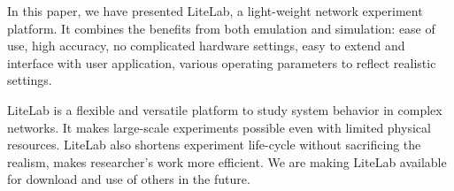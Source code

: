 \documentclass[conference]{IEEEtran}
\begin{document}
In this paper, we have presented LiteLab, a light-weight network
experiment platform.  It combines the benefits from both emulation and
simulation: ease of use, high accuracy, no complicated hardware
settings, easy to extend and interface with user application, various
operating parameters to reflect realistic settings.

LiteLab is a flexible and versatile platform to study system behavior
in complex networks. It makes large-scale experiments possible even
with limited physical resources. LiteLab also shortens experiment
life-cycle without sacrificing the realism, makes researcher's work
more efficient. We are making LiteLab available for download and use
of others in the future.
\end{document}
